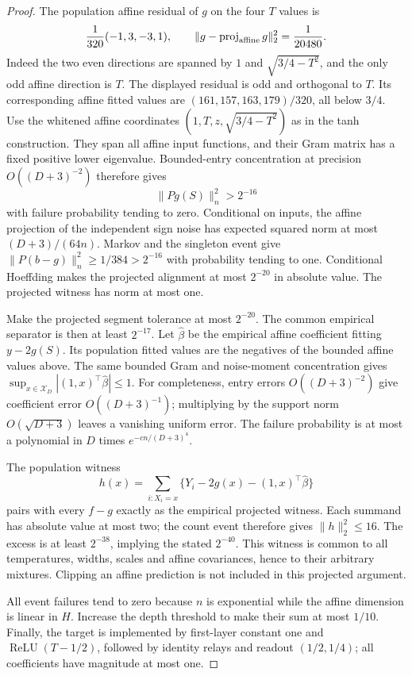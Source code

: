 \begin{proof}
The population affine residual of $g$ on the four $T$ values is
\[
 \frac1{320}(-1,3,-3,1),\qquad
 \|g-\operatorname{proj}_{\rm affine}g\|_2^2=\frac1{20480}.
\]
Indeed the two even directions are spanned by $1$ and $\sqrt{3/4-T^2}$, and the only odd affine direction is $T$. The displayed residual is odd and orthogonal to $T$. Its corresponding affine fitted values are
$(161,157,163,179)/320$, all below $3/4$.
Use the whitened affine coordinates $(1,T,z,\sqrt{3/4-T^2})$ as in the tanh construction. They span all affine input functions, and their Gram matrix has a fixed positive lower eigenvalue. Bounded-entry concentration at precision $O((D+3)^{-2})$ therefore gives
\[
 \|Pg(S)\|_n^2>2^{-16}
\]
with failure probability tending to zero. Conditional on inputs, the affine projection of the independent sign noise has expected squared norm at most $(D+3)/(64n)$. Markov and the singleton event give $\|P(b-g)\|_n^2\ge1/384>2^{-16}$ with probability tending to one. Conditional Hoeffding makes the projected alignment at most $2^{-20}$ in absolute value. The projected witness has norm at most one.

Make the projected segment tolerance at most $2^{-20}$.
The common empirical separator is then at least $2^{-17}$.
Let $\widehat\beta$ be the empirical affine coefficient fitting $y-2g(S)$.
Its population fitted values are the negatives of the bounded affine values above. The same bounded Gram and noise-moment concentration gives
$\sup_{x\in\mathcal X_D}|(1,x)^\top\widehat\beta|\le1$.
For completeness, entry errors $O((D+3)^{-2})$ give coefficient error $O((D+3)^{-1})$; multiplying by the support norm $O(\sqrt{D+3})$ leaves a vanishing uniform error. The failure probability is at most a polynomial in $D$ times $e^{-cn/(D+3)^4}$.

The population witness
\[
 h(x)=\sum_{i:X_i=x}\{Y_i-2g(x)-(1,x)^\top\widehat\beta\}
\]
pairs with every $f-g$ exactly as the empirical projected witness.
Each summand has absolute value at most two; the count event therefore gives $\|h\|_2^2\le16$. The excess is at least $2^{-38}$, implying the stated $2^{-40}$. This witness is common to all temperatures, widths, scales and affine covariances, hence to their arbitrary mixtures. Clipping an affine prediction is not included in this projected argument.

All event failures tend to zero because $n$ is exponential while the affine dimension is linear in $H$. Increase the depth threshold to make their sum at most $1/10$. Finally, the target is implemented by first-layer constant one and $\operatorname{ReLU}(T-1/2)$, followed by identity relays and readout $(1/2,1/4)$; all coefficients have magnitude at most one.
\end{proof}
